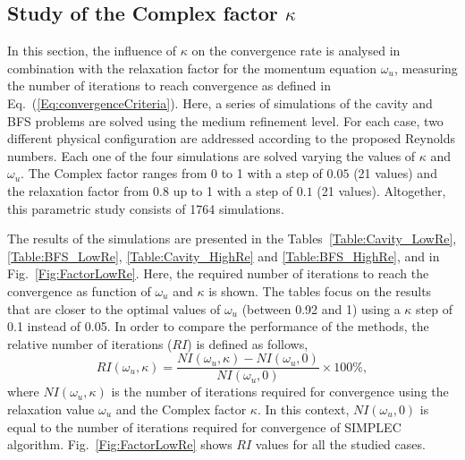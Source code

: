 \documentclass[final,3p,times,11pt,onecolumn]{myElsarticle}
\numberwithin{equation}{section}
\begin{document}

\subsection{Study of the Complex factor $\kappa$}
In this section, the influence of $\kappa$ on the convergence rate is analysed in combination with the relaxation factor for the momentum equation $\omega_{u}$, measuring the number of iterations to reach convergence as defined in Eq.~(\ref{Eq:convergenceCriteria}). Here, a series of simulations of the cavity and BFS problems are solved using the medium refinement level. For each case, two different physical configuration are addressed according to the proposed Reynolds numbers. Each one of the four simulations are solved varying the values of $\kappa$ and $\omega_{u}$. The Complex factor ranges from 0 to 1 with a step of $0.05$ (21 values) and the relaxation factor from 0.8 up to 1 with a step of $0.1$ (21 values). Altogether, this parametric study consists of 1764 simulations.

The results of the simulations are presented in the Tables~\ref{Table:Cavity_LowRe}, \ref{Table:BFS_LowRe}, \ref{Table:Cavity_HighRe} and \ref{Table:BFS_HighRe}, and in Fig.~\ref{Fig:FactorLowRe}. Here, the required number of iterations to reach the convergence as function of $\omega_u$ and $\kappa$ is shown. The tables focus on the results that are closer to the optimal values of $\omega_u$ (between 0.92 and 1) using a $\kappa$ step of 0.1 instead of 0.05. In order to compare the performance of the methods, the relative number of iterations ($RI$) is defined as follows, 
\begin{equation}
\label{Eq:relativeIndex}
RI(\omega_u, \kappa)
=
\dfrac
{
NI(\omega_u, \kappa) - NI(\omega_u, 0)
}
{
NI(\omega_u, 0)
}
\times
100 \%,
\end{equation}
where $NI(\omega_u, \kappa)$ is the number of iterations required for convergence using the relaxation value $\omega_u$ and the Complex factor $\kappa$. In this context, $NI(\omega_u, 0)$ is equal to the number of iterations required for convergence of SIMPLEC algorithm. Fig.~\ref{Fig:FactorLowRe} shows $RI$ values for all the studied cases.
 
\end{document}

